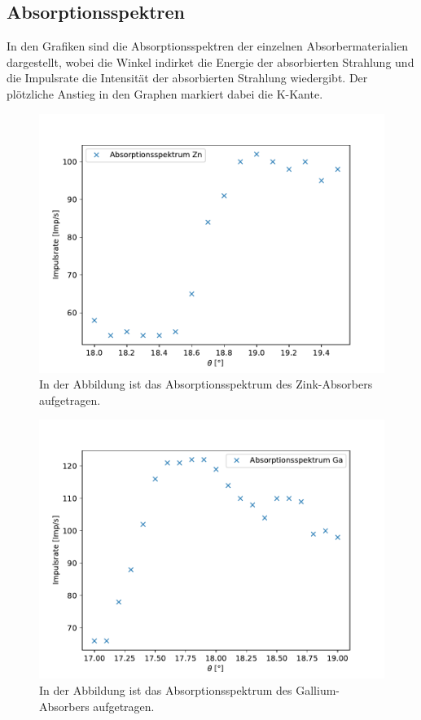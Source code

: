 \documentclass[titlepage = firstcover]{scrartcl}
\begin{document}
            \newpage

            \subsection{Absorptionsspektren}
            In den Grafiken sind die Absorptionsspektren der einzelnen Absorbermaterialien dargestellt, wobei die Winkel indirket die Energie der absorbierten Strahlung und die Impulsrate die 
            Intensität der absorbierten Strahlung wiedergibt. Der plötzliche Anstieg in den Graphen markiert dabei die K-Kante.

            \FloatBarrier
            \begin{figure}[h]
              \centering
              \includegraphics{Zink.pdf}
              \caption{In der Abbildung ist das Absorptionsspektrum des Zink-Absorbers aufgetragen.}
              \label{fig:Zink}
            \end{figure}

            \begin{figure}[h]
              \centering
              \includegraphics{Gallium.pdf}
              \caption{In der Abbildung ist das Absorptionsspektrum des Gallium-Absorbers aufgetragen.}
              \label{fig:Gallium}
            \end{figure}
\end{document}
